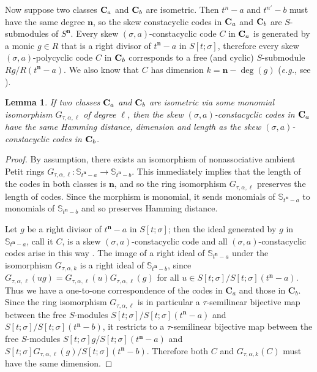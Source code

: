 \documentclass[11pt]{amsart}
\theoremstyle{plain}
\newtheorem{lemma}[theorem]{Lemma}
\theoremstyle{definition}
\numberwithin{equation}{section}
\numberwithin{figure}{section}
\newcommand{\Sone}[1]{\Stsigma/\Stsigma (t^{\de}-#1)} %
\newcommand{\Sonenew}[1]{\mathbb{S}_{t^\de-#1}}
\newcommand{\Stsigma}{S[t;\sigma]}
\newcommand{\de}{\mathbf{n}}  %
\begin{document}
Now suppose two classes ${\bf C}_a$ and ${\bf C}_b$ are  isometric.  Then $t^n -a$ and $t^{n'}-b$ must have the same degree $\mathbf{n}$, so the skew constacyclic codes in ${\bf C}_a$ and ${\bf C}_b$ are $S$-submodules of $S^{\mathbf{n}}$.
 Every skew $(\sigma,a)$-constacyclic code $C$ in ${\bf C}_a$ is generated by a monic $g\in R$ that is a right divisor of $t^\mathbf{n}-a$ in $\Stsigma$, therefore every skew $(\sigma,a)$-polycyclic code $C$ in ${\bf C}_b$ corresponds to a free (and cyclic) $S$-submodule $Rg/R(t^\mathbf{n}-a)$. We also know that $C$ has dimension $k=\mathbf{n}-\deg(g) $ (\emph{e.g.}, see \cite[Theorem 2.9 (i)]{Pumpluen2025}).




\begin{lemma}\label{le:pres}
   If two classes ${\bf C}_a$ and ${\bf C}_b$ are  isometric via some monomial isomorphism $G_{\tau,\alpha,\ell}$ of degree $\ell$, then the skew $(\sigma,a)$-constacyclic  codes in ${\bf C}_a$ have the same Hamming distance, dimension and length as
  the  skew $(\sigma,a)$-constacyclic  codes in ${\bf C}_b$.
   \end{lemma}


 \begin{proof}
By assumption, there exists an isomorphism of nonassociative ambient Petit rings $G_{\tau,\alpha,\ell}:\mathbb{S}_{t^\de-a} \to \mathbb{S}_{t^\de-b} $. This immediately implies that the length of the codes in both classes is $\mathbf{n}$, and so the ring isomorphism $G_{\tau,\alpha,\ell}$ preserves the length of codes. Since the morphism is monomial, it sends monomials of $\Sonenew{a}$ to monomials of $\Sonenew{b}$ and so preserves Hamming distance.

Let $g$ be a right divisor of $t^\de-a$ in $\Stsigma$; then the ideal generated by $g$ in  $\mathbb{S}_{t^\de-a}$, 
call it $C$,  is a skew $(\sigma,a)$-constacyclic code and all $(\sigma,a)$-constacyclic codes arise in this way \cite[Section 2.2]{Pumpluen2025}.  The image of a right ideal of $\mathbb{S}_{t^\de-a}$
under the isomorphism $G_{\tau,\alpha,k}$ is a right ideal of $\mathbb{S}_{t^\de-b}$, 
since $G_{\tau,\alpha,\ell}(ug)=G_{\tau,\alpha,\ell}(u)G_{\tau,\alpha,\ell}(g)$ for all $u\in \Sone{a}$.  Thus we have a one-to-one correspondence of the codes in $\mathbf{C}_a$ and those in $\mathbf{C}_b$.  Since the ring isomorphism $G_{\tau,\alpha,\ell}$ is in particular a $\tau$-semilinear bijective map between the free $S$-modules $\Stsigma/\Stsigma(t^\mathbf{n} -a)$ and $\Stsigma/\Stsigma(t^\mathbf{n} -b)$, it restricts to a  $\tau$-semilinear bijective map between the free $S$-modules $\Stsigma g/\Stsigma(t^\mathbf{n} -a)$ and $\Stsigma G_{\tau,\alpha,\ell}(g)/\Stsigma(t^\mathbf{n} -b)$. Therefore both $C$ and $G_{\tau,\alpha,k}(C)$ must have the same dimension.
\end{proof}
\end{document}
